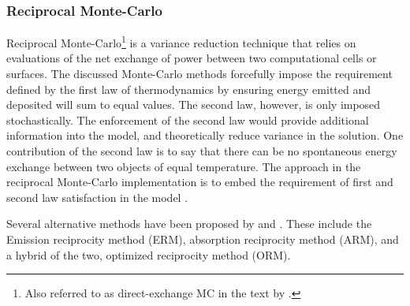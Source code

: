 \subsubsection{Reciprocal Monte-Carlo}
Reciprocal Monte-Carlo\footnote{Also referred to as direct-exchange MC in the text by \citet{Modest2013RadiativeTransfer}.} is a variance reduction technique that relies on evaluations of the net exchange of power between two computational cells or surfaces.
The discussed Monte-Carlo methods forcefully impose the requirement defined by the first law of thermodynamics by ensuring energy emitted and deposited will sum to equal values. The second law, however, is only imposed stochastically.
The enforcement of the second law would provide additional information into the model, and theoretically reduce variance in the solution. One contribution of the second law is to say that there can be no spontaneous energy exchange between two objects of equal temperature. 
The approach in the reciprocal Monte-Carlo implementation is to embed the requirement of first and second law satisfaction in the model \cite{Howell2020ThermalTransfer}.

Several alternative methods have been proposed by \citet{Tesse2002RadiativeApproach} and \citet{Dupoirieux2006AnThicknesses}. These include the Emission reciprocity method (ERM), absorption reciprocity method (ARM), and a hybrid of the two, optimized reciprocity method (ORM).

